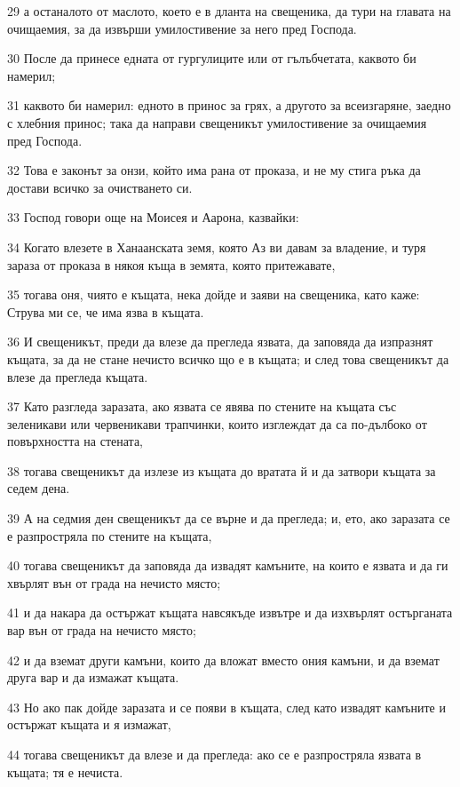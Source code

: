 \par 29 а останалото от маслото, което е в дланта на свещеника, да тури на главата на очищаемия, за да извърши умилостивение за него пред Господа.
\par 30 После да принесе едната от гургулиците или от гълъбчетата, каквото би намерил;
\par 31 каквото би намерил: едното в принос за грях, а другото за всеизгаряне, заедно с хлебния принос; така да направи свещеникът умилостивение за очищаемия пред Господа.
\par 32 Това е законът за онзи, който има рана от проказа, и не му стига ръка да достави всичко за очистването си.
\par 33 Господ говори още на Моисея и Аарона, казвайки:
\par 34 Когато влезете в Ханаанската земя, която Аз ви давам за владение, и туря зараза от проказа в някоя къща в земята, която притежавате,
\par 35 тогава оня, чиято е къщата, нека дойде и заяви на свещеника, като каже: Струва ми се, че има язва в къщата.
\par 36 И свещеникът, преди да влезе да прегледа язвата, да заповяда да изпразнят къщата, за да не стане нечисто всичко що е в къщата; и след това свещеникът да влезе да прегледа къщата.
\par 37 Като разгледа заразата, ако язвата се явява по стените на къщата със зеленикави или червеникави трапчинки, които изглеждат да са по-дълбоко от повърхността на стената,
\par 38 тогава свещеникът да излезе из къщата до вратата й и да затвори къщата за седем дена.
\par 39 А на седмия ден свещеникът да се върне и да прегледа; и, ето, ако заразата се е разпростряла по стените на къщата,
\par 40 тогава свещеникът да заповяда да извадят камъните, на които е язвата и да ги хвърлят вън от града на нечисто място;
\par 41 и да накара да остържат къщата навсякъде извътре и да изхвърлят остърганата вар вън от града на нечисто място;
\par 42 и да вземат други камъни, които да вложат вместо ония камъни, и да вземат друга вар и да измажат къщата.
\par 43 Но ако пак дойде заразата и се появи в къщата, след като извадят камъните и остържат къщата и я измажат,
\par 44 тогава свещеникът да влезе и да прегледа: ако се е разпростряла язвата в къщата; тя е нечиста.
